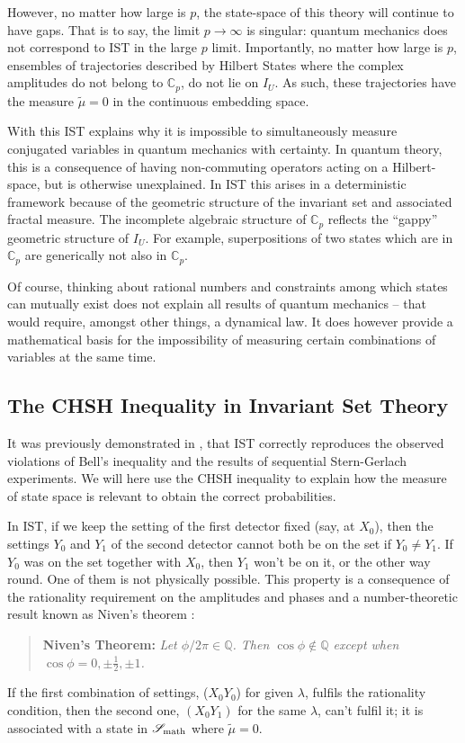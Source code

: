 \documentclass[12pt]{article}
\begin{document}
However, no matter how large is $p$, the state-space of this theory will continue to have gaps. That is to say, the limit $p \rightarrow \infty$ is singular: quantum mechanics does not correspond to {\sc IST} in the large $p$ limit. Importantly, no matter how large is $p$, ensembles of trajectories described by Hilbert States where the complex amplitudes do not belong to $\mathbb C_p$, do not lie on $I_U$. As such, these trajectories have the measure $\tilde \mu=0$ in the continuous embedding space. 

With this {\sc IST} explains why it is impossible to simultaneously measure conjugated variables in quantum mechanics with certainty. In quantum theory, this is a consequence of having non-commuting operators acting on a Hilbert-space, but is otherwise unexplained. In {\sc IST} this arises in a deterministic framework because of the geometric structure of the invariant set and associated fractal measure. The incomplete algebraic structure of ${\mathbb C}_p$ reflects the ``gappy'' geometric structure of $I_U$. For example, superpositions of two states which are in ${\mathbb C}_p$ are generically not also in ${\mathbb C}_p$. 

Of course, thinking about rational numbers and constraints among which states can mutually exist does not explain all results of quantum mechanics -- that would require, amongst other things, a dynamical law. It does however provide a mathematical basis for the impossibility of measuring certain combinations of variables at the same time.


\subsection{The CHSH Inequality in Invariant Set Theory}
\label{CHSHIST}

It was previously demonstrated in \mbox{\cite{Palmer2020Discretization}}, that {\sc IST} correctly reproduces the observed violations of Bell's inequality and the results of sequential Stern-Gerlach experiments. We will here use the {\sc CHSH} inequality to explain how the measure of state space is relevant to obtain the correct probabilities.

In {\sc IST}, if we keep the setting of the first detector fixed (say, at $X_0$), then the settings $Y_0$ and $Y_1$ of the second detector cannot both be on the set if $Y_0 \neq Y_1$. If $Y_0$ was on the set together with $X_0$, then $Y_1$ won't be on it, or the other way round. One of them is not physically possible. This property is a consequence of the rationality requirement on the amplitudes and phases and a number-theoretic result known as Niven's theorem
 \cite{Niven1956irrational,Jahnel2010Sines}:
\begin{quote}
{\bf Niven's Theorem:}
 \emph{Let $\phi/2\pi \in \mathbb{Q}$. Then $\cos \phi \notin \mathbb{Q}$ except when $\cos \phi =0, \pm \frac{1}{2}, \pm 1$.}
\end{quote}
If the first combination of settings, ($X_0Y_0$) for given $\lambda$, fulfils the rationality condition, then the second one, $(X_0Y_1)$ for the same $\lambda$, can't fulfil it; it is associated with a state in ${\mathscr S}_{\rm math}$ where $\tilde \mu=0$. 
\end{document}
